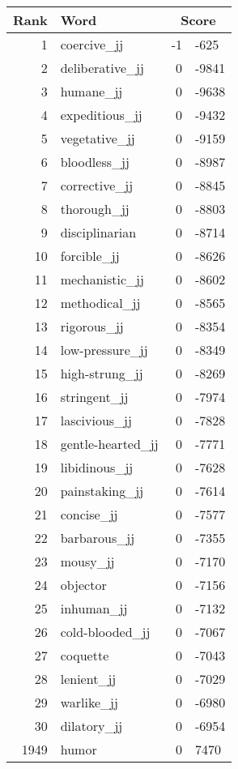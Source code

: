 \begin{longtable}[!htbp]{| rlr@{.}l |}
    \hline
    \textbf{Rank} & \textbf{Word} & \multicolumn{2}{c|}{\textbf{Score}} \\
    \hline
    \endhead
    1 & coercive\_jj & -1 & -625 \\
    2 & deliberative\_jj & 0 & -9841 \\
    3 & humane\_jj & 0 & -9638 \\
    4 & expeditious\_jj & 0 & -9432 \\
    5 & vegetative\_jj & 0 & -9159 \\
    6 & bloodless\_jj & 0 & -8987 \\
    7 & corrective\_jj & 0 & -8845 \\
    8 & thorough\_jj & 0 & -8803 \\
    9 & disciplinarian & 0 & -8714 \\
    10 & forcible\_jj & 0 & -8626 \\
    11 & mechanistic\_jj & 0 & -8602 \\
    12 & methodical\_jj & 0 & -8565 \\
    13 & rigorous\_jj & 0 & -8354 \\
    14 & low-pressure\_jj & 0 & -8349 \\
    15 & high-strung\_jj & 0 & -8269 \\
    16 & stringent\_jj & 0 & -7974 \\
    17 & lascivious\_jj & 0 & -7828 \\
    18 & gentle-hearted\_jj & 0 & -7771 \\
    19 & libidinous\_jj & 0 & -7628 \\
    20 & painstaking\_jj & 0 & -7614 \\
    21 & concise\_jj & 0 & -7577 \\
    22 & barbarous\_jj & 0 & -7355 \\
    23 & mousy\_jj & 0 & -7170 \\
    24 & objector & 0 & -7156 \\
    25 & inhuman\_jj & 0 & -7132 \\
    26 & cold-blooded\_jj & 0 & -7067 \\
    27 & coquette & 0 & -7043 \\
    28 & lenient\_jj & 0 & -7029 \\
    29 & warlike\_jj & 0 & -6980 \\
    30 & dilatory\_jj & 0 & -6954 \\
    1949 & humor & 0 & 7470 \\

\end{longtable}
